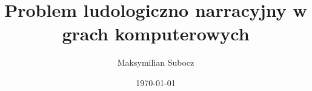 \documentclass{beamer}
\title{Problem ludologiczno narracyjny w grach komputerowych}
\author{Maksymilian Subocz}
\date{\today}
\begin{document}
\frame{\titlepage}







\end{document}
